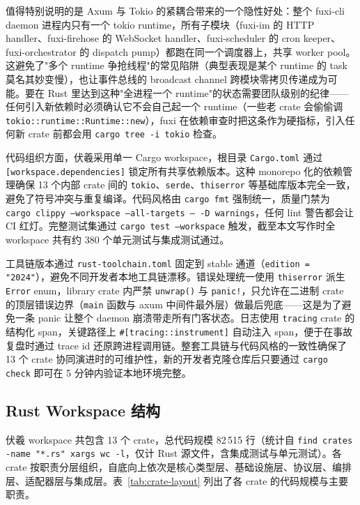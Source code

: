 值得特别说明的是 Axum 与 Tokio 的紧耦合带来的一个隐性好处：整个 fuxi-cli daemon 进程内只有一个 tokio runtime，所有子模块（fuxi-im 的 HTTP handler、fuxi-firehose 的 WebSocket handler、fuxi-scheduler 的 cron keeper、fuxi-orchestrator 的 dispatch pump）都跑在同一个调度器上，共享 worker pool。这避免了"多个 runtime 争抢线程"的常见陷阱（典型表现是某个 runtime 的 task 莫名其妙变慢），也让事件总线的 broadcast channel 跨模块零拷贝传递成为可能。要在 Rust 里达到这种"全进程一个 runtime"的状态需要团队级别的纪律——任何引入新依赖时必须确认它不会自己起一个 runtime（一些老 crate 会偷偷调 \texttt{tokio::runtime::Runtime::new}），fuxi 在依赖审查时把这条作为硬指标，引入任何新 crate 前都会用 \texttt{cargo tree -i tokio} 检查。

代码组织方面，伏羲采用单一 Cargo workspace，根目录 \texttt{Cargo.toml} 通过 \texttt{[workspace.dependencies]} 锁定所有共享依赖版本。这种 monorepo 化的依赖管理确保 13 个内部 crate 间的 \texttt{tokio}、\texttt{serde}、\texttt{thiserror} 等基础库版本完全一致，避免了符号冲突与重复编译。代码风格由 \texttt{cargo fmt} 强制统一，质量门禁为 \texttt{cargo clippy --workspace --all-targets -- -D warnings}，任何 lint 警告都会让 CI 红灯。完整测试集通过 \texttt{cargo test --workspace} 触发，截至本文写作时全 workspace 共有约 380 个单元测试与集成测试通过。

工具链版本通过 \texttt{rust-toolchain.toml} 固定到 stable 通道（\texttt{edition = "2024"}），避免不同开发者本地工具链漂移。错误处理统一使用 \texttt{thiserror} 派生 \texttt{Error} enum，library crate 内严禁 \texttt{unwrap()} 与 \texttt{panic!}，只允许在二进制 crate 的顶层错误边界（\texttt{main} 函数与 axum 中间件最外层）做最后兜底——这是为了避免一条 panic 让整个 daemon 崩溃带走所有门客状态。日志使用 \texttt{tracing} crate 的结构化 span，关键路径上 \texttt{\#[tracing::instrument]} 自动注入 span，便于在事故复盘时通过 trace id 还原跨进程调用链。整套工具链与代码风格的一致性确保了 13 个 crate 协同演进时的可维护性，新的开发者克隆仓库后只要通过 \texttt{cargo check} 即可在 5 分钟内验证本地环境完整。

\subsection{Rust Workspace 结构}

伏羲 workspace 共包含 13 个 crate，总代码规模 82\,515 行（统计自 \texttt{find crates -name "*.rs" \textbar{} xargs wc -l}，仅计 Rust 源文件，含集成测试与单元测试）。各 crate 按职责分层组织，自底向上依次是核心类型层、基础设施层、协议层、编排层、适配器层与集成层。表~\ref{tab:crate-layout} 列出了各 crate 的代码规模与主要职责。

